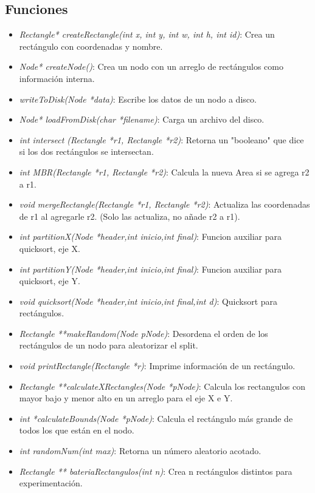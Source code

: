 \documentclass[letterpaper,10pt]{article}
\begin{document}
	\subsection{Funciones}

	\begin{itemize}
		\item \textit{Rectangle* createRectangle(int x, int y, int w, int h, int id)}: Crea un rectángulo con coordenadas y nombre.
		\item \textit{Node* createNode()}: Crea un nodo con un arreglo de rectángulos como información interna.
		\item \textit{writeToDisk(Node *data)}: Escribe los datos de un nodo a disco.
		\item \textit{Node* loadFromDisk(char *filename)}: Carga un archivo del disco.
		\item \textit{int intersect (Rectangle *r1, Rectangle *r2)}: Retorna un "booleano" que dice si los dos rectángulos se intersectan.
		\item \textit{int MBR(Rectangle *r1, Rectangle *r2)}: Calcula la nueva Area si se agrega r2 a r1.
		\item \textit{void mergeRectangle(Rectangle *r1, Rectangle *r2)}: Actualiza las coordenadas de r1 al agregarle r2. (Solo las actualiza, no añade r2 a r1).
		\item \textit{int partitionX(Node *header,int inicio,int final)}: Funcion auxiliar para quicksort, eje X.
		\item \textit{int partitionY(Node *header,int inicio,int final)}: Funcion auxiliar para quicksort, eje Y.
		\item \textit{void quicksort(Node *header,int inicio,int final,int d)}: Quicksort para rectángulos.
		\item \textit{Rectangle **makeRandom(Node pNode)}: Desordena el orden de los rectángulos de un nodo para aleatorizar el split.
		\item \textit{void printRectangle(Rectangle *r)}: Imprime información de un rectángulo.
		\item \textit{Rectangle **calculateXRectangles(Node *pNode)}: Calcula los rectangulos con mayor bajo y menor alto en un arreglo para el eje X e Y.
		\item \textit{int *calculateBounds(Node *pNode)}: Calcula el rectángulo más grande de todos los que están en el nodo.
		\item \textit{int randomNum(int max)}: Retorna un número aleatorio acotado.
		\item \textit{Rectangle ** bateriaRectangulos(int n)}: Crea n rectángulos distintos para experimentación.

\end{itemize}
\end{document}
